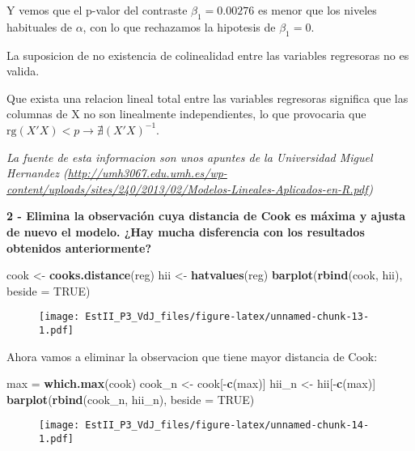 \documentclass[]{article}
\newenvironment{Shaded}{\begin{snugshade}}{\end{snugshade}}
\newcommand{\KeywordTok}[1]{\textcolor[rgb]{0.13,0.29,0.53}{\textbf{{#1}}}}
\newcommand{\DataTypeTok}[1]{\textcolor[rgb]{0.13,0.29,0.53}{{#1}}}
\newcommand{\StringTok}[1]{\textcolor[rgb]{0.31,0.60,0.02}{{#1}}}
\newcommand{\OtherTok}[1]{\textcolor[rgb]{0.56,0.35,0.01}{{#1}}}
\newcommand{\NormalTok}[1]{{#1}}
\begin{document}
Y vemos que el p-valor del contraste \(\beta_1 = 0.00276\) es menor que
los niveles habituales de \(\alpha\), con lo que rechazamos la hipotesis
de \(\beta_1 = 0\).

La suposicion de no existencia de colinealidad entre las variables
regresoras no es valida.

Que exista una relacion lineal total entre las variables regresoras
significa que las columnas de X no son linealmente independientes, lo
que provocaria que
\(\text{rg}(X'X) < p \rightarrow \nexists (X'X)^{-1}\).

\emph{La fuente de esta informacion son unos apuntes de la Universidad
Miguel Hernandez
(\url{http://umh3067.edu.umh.es/wp-content/uploads/sites/240/2013/02/Modelos-Lineales-Aplicados-en-R.pdf})}

\textbf{2 - Elimina la observación cuya distancia de Cook es máxima y
ajusta de nuevo el modelo. ¿Hay mucha disferencia con los resultados
obtenidos anteriormente?}

\begin{Shaded}
\begin{Highlighting}[]
\NormalTok{cook <-}\StringTok{ }\KeywordTok{cooks.distance}\NormalTok{(reg)}
\NormalTok{hii <-}\StringTok{ }\KeywordTok{hatvalues}\NormalTok{(reg)}
\KeywordTok{barplot}\NormalTok{(}\KeywordTok{rbind}\NormalTok{(cook, hii), }\DataTypeTok{beside =} \OtherTok{TRUE}\NormalTok{)}
\end{Highlighting}
\end{Shaded}

\begin{figure}[htbp]
\centering
\texttt{[image: EstII\_P3\_VdJ\_files/figure-latex/unnamed-chunk-13-1.pdf]}
\caption{}
\end{figure}

Ahora vamos a eliminar la observacion que tiene mayor distancia de Cook:

\begin{Shaded}
\begin{Highlighting}[]
\NormalTok{max =}\StringTok{ }\KeywordTok{which.max}\NormalTok{(cook)}
\NormalTok{cook_n <-}\StringTok{ }\NormalTok{cook[-}\KeywordTok{c}\NormalTok{(max)]}
\NormalTok{hii_n <-}\StringTok{ }\NormalTok{hii[-}\KeywordTok{c}\NormalTok{(max)]}
\KeywordTok{barplot}\NormalTok{(}\KeywordTok{rbind}\NormalTok{(cook_n, hii_n), }\DataTypeTok{beside =} \OtherTok{TRUE}\NormalTok{)}
\end{Highlighting}
\end{Shaded}

\begin{figure}[htbp]
\centering
\texttt{[image: EstII\_P3\_VdJ\_files/figure-latex/unnamed-chunk-14-1.pdf]}
\caption{}
\end{figure}
\end{document}
